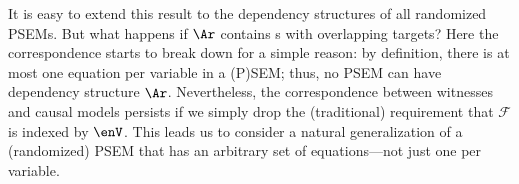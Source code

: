 It is easy to extend this result to the dependency structures of all randomized PSEMs.  But what happens if $\Ar$ contains
\arc s with overlapping targets?
Here the correspondence starts to break down for a simple reason:
by definition, there is at most one equation per variable in a
(P)SEM;
thus, no PSEM can have dependency structure $\Ar$. 
Nevertheless, 
    the correspondence between witnesses and causal models persists if we simply drop the
(traditional)
requirement that $\mathcal F$ is indexed by $\enV$.
This leads us to consider
a natural generalization of a 
(randomized)
PSEM that has an arbitrary set of equations---not just one per variable. 

